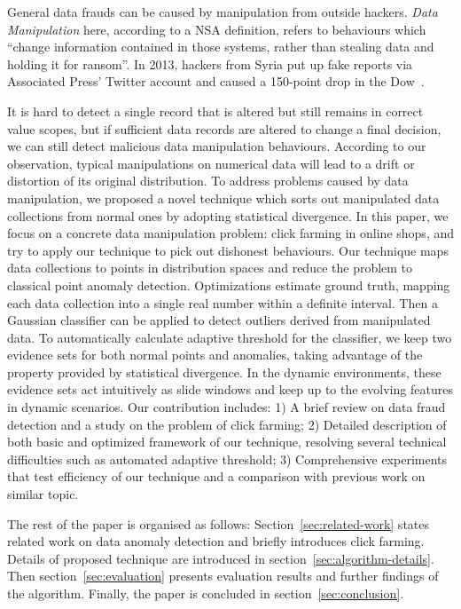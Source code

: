 \documentclass{article}
\begin{document}
		General data frauds can be caused by manipulation from outside hackers.
		\textit{Data Manipulation} here, according to a NSA definition, refers to behaviours which ``change information contained in those systems, rather than stealing data and holding it for ransom''.
		In 2013, hackers from Syria put up fake reports via Associated Press' Twitter account and caused a 150-point drop in the Dow~\cite{SyriaHacker}.
		
		It is hard to detect a single record that is altered but still remains in correct value scopes, but if sufficient data records are altered to change a final decision, we can still detect malicious data manipulation behaviours.
		According to our observation, typical manipulations on numerical data will lead to a drift or distortion of its original distribution.
		To address problems caused by data manipulation, we proposed a novel technique which sorts out manipulated data collections from normal ones by adopting statistical divergence.
		In this paper, we focus on a concrete data manipulation problem: click farming in online shops, and try to apply our technique to pick out dishonest behaviours.
		Our technique maps data collections to points in distribution spaces and reduce the problem to classical point anomaly detection.
		Optimizations estimate ground truth, mapping each data collection into a single real number within a definite interval. Then a Gaussian classifier can be applied to detect outliers derived from manipulated data. To automatically calculate adaptive threshold for the classifier, we keep two evidence sets for both normal points and anomalies, taking advantage of the property provided by statistical divergence.
		In the dynamic environments, these evidence sets act intuitively as slide windows and keep up to the evolving features in dynamic scenarios.
		Our contribution includes: 1) A brief review on data fraud detection and a study on the problem of click farming; 2) Detailed description of both basic and optimized framework of our technique, resolving several technical difficulties such as automated adaptive threshold; 3) Comprehensive experiments that test efficiency of our technique and a comparison with previous work on similar topic.
		
		The rest of the paper is organised as follows: Section~\ref{sec:related-work} states related work on data anomaly detection and briefly introduces click farming.
		Details of proposed technique are introduced in section~\ref{sec:algorithm-details}. Then section~\ref{sec:evaluation} presents evaluation results and further findings of the algorithm. Finally, the paper is concluded in section~\ref{sec:conclusion}.
		
\end{document}
